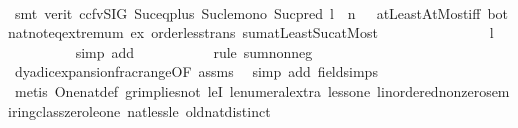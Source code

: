 \begin{isabellebody}
\ \ \ \ \ \ \ \ \isamarkupfalse%
\ {\isacharparenleft}{\kern0pt}smt\ {\isacharparenleft}{\kern0pt}verit{\isacharcomma}{\kern0pt}\ ccfv{\isacharunderscore}{\kern0pt}SIG{\isacharparenright}{\kern0pt}\ Suc{\isacharunderscore}{\kern0pt}eq{\isacharunderscore}{\kern0pt}plus{}\ Suc{\isacharunderscore}{\kern0pt}le{\isacharunderscore}{\kern0pt}mono\ Suc{\isacharunderscore}{\kern0pt}pred{\isacharprime}{\kern0pt}\ {\isacartoucheopen}l\ {\isasymin}\ {\isacharbraceleft}{\kern0pt}{}{\isachardot}{\kern0pt}{\isachardot}{\kern0pt}n\ {\isacharminus}{\kern0pt}\ {}{\isacharbraceright}{\kern0pt}{\isacartoucheclose}\ atLeastAtMost{\isacharunderscore}{\kern0pt}iff\ bot{\isacharunderscore}{\kern0pt}nat{\isacharunderscore}{\kern0pt}{}{\isachardot}{\kern0pt}not{\isacharunderscore}{\kern0pt}eq{\isacharunderscore}{\kern0pt}extremum\ ex\ order{\isacharunderscore}{\kern0pt}less{\isacharunderscore}{\kern0pt}trans\ sum{\isachardot}{\kern0pt}atLeast{\isacharunderscore}{\kern0pt}Suc{\isacharunderscore}{\kern0pt}atMost{\isacharparenright}{\kern0pt}\isanewline
\ \ \ \ \ \ \isamarkupfalse%
\ \isamarkupfalse%
\ {\isachardoublequoteopen}{\isachardot}{\kern0pt}{\isachardot}{\kern0pt}{\isachardot}{\kern0pt}\ {\isasymge}\ {}\ {\isacharslash}{\kern0pt}\ {}\ {\isacharcircum}{\kern0pt}\ {\isacharparenleft}{\kern0pt}l{\isacharplus}{\kern0pt}{}{\isacharparenright}{\kern0pt}{\isachardoublequoteclose}\isanewline
\ \ \ \ \ \ \ \ \isamarkupfalse%
\ {\isacharparenleft}{\kern0pt}simp\ add{\isacharcolon}{\kern0pt}\ {}{\isacharparenright}{\kern0pt}\isanewline
\ \ \ \ \ \ \ \ \isamarkupfalse%
\ {\isacharparenleft}{\kern0pt}rule\ sum{\isacharunderscore}{\kern0pt}nonneg{\isacharparenright}{\kern0pt}\isanewline
\ \ \ \ \ \ \ \ \isamarkupfalse%
\ dyadic{\isacharunderscore}{\kern0pt}expansion{\isacharunderscore}{\kern0pt}frac{\isacharunderscore}{\kern0pt}range{\isacharbrackleft}{\kern0pt}OF\ assms{\isacharparenleft}{\kern0pt}{}{\isacharparenright}{\kern0pt}{\isacharbrackright}{\kern0pt}\ \isamarkupfalse%
\ {\isacharparenleft}{\kern0pt}simp\ add{\isacharcolon}{\kern0pt}\ field{\isacharunderscore}{\kern0pt}simps{\isacharparenright}{\kern0pt}\isanewline
\ \ \ \ \ \ \ \ \isamarkupfalse%
\ {\isacharparenleft}{\kern0pt}metis\ One{\isacharunderscore}{\kern0pt}nat{\isacharunderscore}{\kern0pt}def\ gr{\isacharunderscore}{\kern0pt}implies{\isacharunderscore}{\kern0pt}not{}\ leI\ le{\isacharunderscore}{\kern0pt}numeral{\isacharunderscore}{\kern0pt}extra{\isacharparenleft}{\kern0pt}{}{\isacharparenright}{\kern0pt}\ less{\isacharunderscore}{\kern0pt}one\ linordered{\isacharunderscore}{\kern0pt}nonzero{\isacharunderscore}{\kern0pt}semiring{\isacharunderscore}{\kern0pt}class{\isachardot}{\kern0pt}zero{\isacharunderscore}{\kern0pt}le{\isacharunderscore}{\kern0pt}one\ nat{\isacharunderscore}{\kern0pt}less{\isacharunderscore}{\kern0pt}le\ old{\isachardot}{\kern0pt}nat{\isachardot}{\kern0pt}distinct{\isacharparenleft}{\kern0pt}{}{\isacharparenright}{\kern0pt}{\isacharparenright}{\kern0pt}\isanewline

\end{isabellebody}
